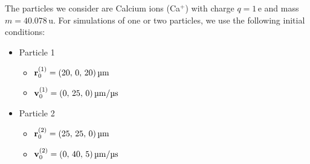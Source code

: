 The particles we consider are Calcium ions (Ca$^+$) with charge $q=1 \,\mathrm{e}$ and mass $m = 40.078 \,\mathrm{u}$. For simulations of one or two particles, we use the following initial conditions:
\begin{itemize}
    \item Particle 1\label{item:initial_conditions_p1}
    \begin{itemize}
        \item[] $\vec{r}^{(1)}_0 = (20, \,0, \,20) \, \mathrm{\text{\textmu}m} $
        \item[] $\vec{v}^{(1)}_0 = (0,\,25,\,0) \, \mathrm{\text{\textmu}m}/ \mathrm{\text{\textmu}s}$
    \end{itemize}
    \item Particle 2\label{item:initial_conditions_p2}
    \begin{itemize}
        \item[] $\vec{r}^{(2)}_0 = (25, \,25, \,0) \, \mathrm{\text{\textmu}m} $
        \item[] $\vec{v}^{(2)}_0 = (0,\,40,\,5) \, \mathrm{\text{\textmu}m}/ \mathrm{\text{\textmu}s}$
    \end{itemize}
\end{itemize}







